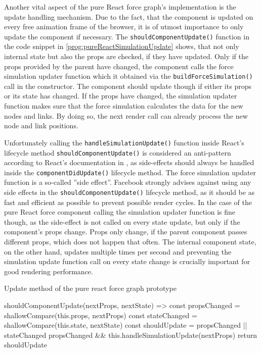 Another vital aspect of the pure React force graph's implementation is the update handling mechanism. Due to the fact, that the component is updated on every free animation frame of the browser, it is of utmost importance to only update the component if necessary. The \texttt{shouldComponentUpdate()} function in the code snippet in \ref{prog:pureReactSimulationUpdate} shows, that not only internal state but also the props are checked, if they have updated. Only if the props provided by the parent have changed, the component calls the force simulation updater function which it obtained via the \texttt{buildForceSimulation()} call in the constructor. The component should update though if either its props or its state has changed. If the props have changed, the simulation updater function makes sure that the force simulation calculates the data for the new nodes and links. By doing so, the next render call can already process the new node and link positions.

Unfortunately calling the \texttt{handleSimulationUpdate()} function inside React's lifecycle method \texttt{shouldComponentUpdate()} is considered an anti-pattern according to React's documentation in \cite[/docs/react-component.html]{React}, as side-effects should always be handled inside the \texttt{componentDidUpdate()} lifecycle method. The force simulation updater function is a so-called ''side effect''. Facebook strongly advises against using any side effects in the \texttt{shouldComponentUpdate()} lifecycle method, as it should be as fast and efficient as possible to prevent possible render cycles. In the case of the pure React force component calling the simulation updater function is fine though, as the side-effect is not called on every state update, but only if the component's props change. Props only change, if the parent component passes different props, which does not happen that often. The internal component state, on the other hand, updates multiple times per second and preventing the simulation update function call on every state change is crucially important for good rendering performance.

\begin{program}
\caption{Update method of the pure react force graph prototype}
\label{prog:pureReactSimulationUpdate}
\begin{JsCode}
shouldComponentUpdate(nextProps, nextState) => {
  const propsChanged = shallowCompare(this.props, nextProps)
  const stateChanged = shallowCompare(this.state, nextState)
  const shouldUpdate = propsChanged || stateChanged
  propsChanged && this.handleSimulationUpdate(nextProps)
  return shouldUpdate
}
\end{JsCode}
\end{program}

